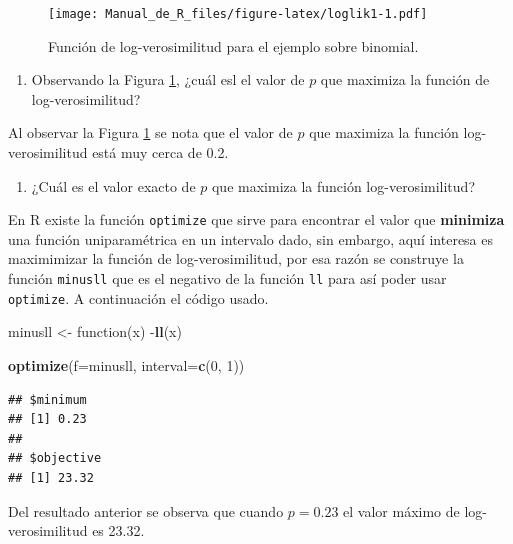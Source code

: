 \documentclass[10pt,]{krantz}
\makeatletter
\newenvironment{Shaded}{\begin{snugshade}}{\end{snugshade}}
\newcommand{\KeywordTok}[1]{\textcolor[rgb]{0.13,0.29,0.53}{\textbf{{#1}}}}
\newcommand{\DataTypeTok}[1]{\textcolor[rgb]{0.13,0.29,0.53}{{#1}}}
\newcommand{\DecValTok}[1]{\textcolor[rgb]{0.00,0.00,0.81}{{#1}}}
\newcommand{\StringTok}[1]{\textcolor[rgb]{0.31,0.60,0.02}{{#1}}}
\newcommand{\NormalTok}[1]{{#1}}
\providecommand{\tightlist}{%
  \setlength{\itemsep}{0pt}\setlength{\parskip}{0pt}}
\let\proglang=\textsf
\newenvironment{kframe}{%
\medskip{}
\setlength{\fboxsep}{.8em}
 \def\at@end@of@kframe{}%
 \ifinner\ifhmode%
  \def\at@end@of@kframe{\end{minipage}}%
  \begin{minipage}{\columnwidth}%
 \fi\fi%
 \def\FrameCommand##1{\hskip\@totalleftmargin \hskip-\fboxsep
 \colorbox{shadecolor}{##1}\hskip-\fboxsep
     \hskip-\linewidth \hskip-\@totalleftmargin \hskip\columnwidth}%
 \MakeFramed {\advance\hsize-\width
   \@totalleftmargin\z@ \linewidth\hsize
   \@setminipage}}%
 {\par\unskip\endMakeFramed%
 \at@end@of@kframe}
\renewenvironment{Shaded}{\begin{kframe}}{\end{kframe}}
\makeatother
\begin{document}
\begin{figure}[htbp]
\centering
\texttt{[image: Manual\_de\_R\_files/figure-latex/loglik1-1.pdf]}
\caption{\label{fig:loglik1}Función de log-verosimilitud para el ejemplo
sobre binomial.}
\end{figure}

\begin{enumerate}
\def\labelenumi{\arabic{enumi})}
\setcounter{enumi}{3}
\tightlist
\item
  Observando la Figura \ref{fig:loglik1}, ¿cuál esl el valor de \(p\)
  que maximiza la función de log-verosimilitud?
\end{enumerate}

Al observar la Figura \ref{fig:loglik1} se nota que el valor de \(p\)
que maximiza la función log-verosimilitud está muy cerca de 0.2.

\begin{enumerate}
\def\labelenumi{\arabic{enumi})}
\setcounter{enumi}{4}
\tightlist
\item
  ¿Cuál es el valor exacto de \(p\) que maximiza la función
  log-verosimilitud?
\end{enumerate}

En \proglang{R} existe la función \texttt{optimize} que sirve para
encontrar el valor que \textbf{minimiza} una función uniparamétrica en
un intervalo dado, sin embargo, aquí interesa es maximimizar la función
de log-verosimilitud, por esa razón se construye la función
\texttt{minusll} que es el negativo de la función \texttt{ll} para así
poder usar \texttt{optimize}. A continuación el código usado.

\begin{Shaded}
\begin{Highlighting}[]
\NormalTok{minusll <-}\StringTok{ }\NormalTok{function(x) -}\KeywordTok{ll}\NormalTok{(x)}

\KeywordTok{optimize}\NormalTok{(}\DataTypeTok{f=}\NormalTok{minusll, }\DataTypeTok{interval=}\KeywordTok{c}\NormalTok{(}\DecValTok{0}\NormalTok{, }\DecValTok{1}\NormalTok{))}
\end{Highlighting}
\end{Shaded}

\begin{verbatim}
## $minimum
## [1] 0.23
## 
## $objective
## [1] 23.32
\end{verbatim}

Del resultado anterior se observa que cuando \(p=0.23\) el valor máximo
de log-verosimilitud es 23.32.
\end{document}
